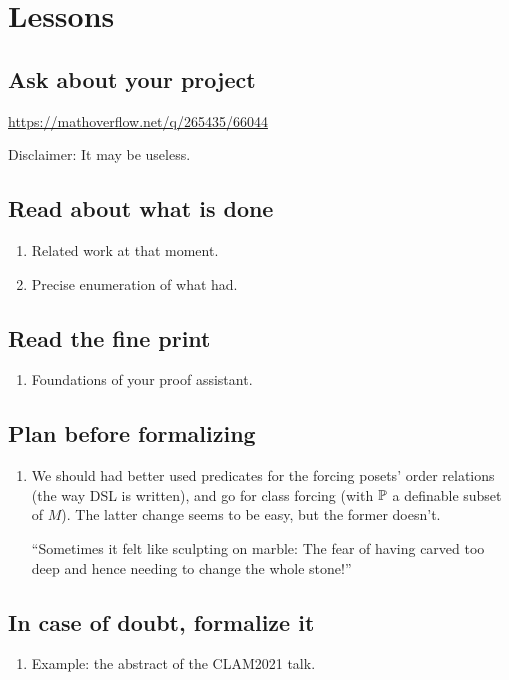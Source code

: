 \section{Lessons}\label{sec:lessons}

\subsection{Ask about your project}
\url{https://mathoverflow.net/q/265435/66044}

Disclaimer: It may be useless.

\subsection{Read about what is done}
\begin{enumerate}
\item Related work at that moment.
\item Precise enumeration of what  had.
\end{enumerate}

\subsection{Read the fine print}
\begin{enumerate}
\item Foundations of your proof assistant.
\end{enumerate}

\subsection{Plan before formalizing}
\begin{enumerate}
\item We should had better used predicates for the forcing posets'
  order relations (the way DSL is written), and go for class forcing
  (with $\mathbb{P}$ a definable subset of $M$). The latter change seems to be
  easy, but the former doesn't.
  
  “Sometimes it felt like sculpting on marble: The fear of having
  carved too deep and hence needing to change the whole stone!”
\end{enumerate}

\subsection{In case of doubt, formalize it}
\begin{enumerate}
\item Example: the abstract of the CLAM2021 talk.
\end{enumerate}

